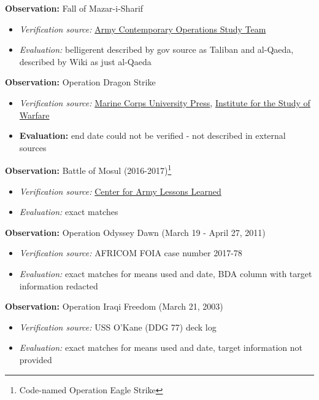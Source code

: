 \documentclass[fleqn,12pt]{article}
\begin{document}
\textbf{Observation:} Fall of Mazar-i-Sharif
\begin{itemize}
    \item \textit{Verification source:} \href{https://history.army.mil/html/bookshelves/resmat/GWOT/DifferentKindofWar.pdf}{Army Contemporary Operations Study Team}
    \item \textit{Evaluation:} belligerent described by gov source as Taliban and al-Qaeda, described by Wiki as just al-Qaeda
\end{itemize}

\textbf{Observation:} Operation Dragon Strike
\begin{itemize}
    \item \textit{Verification source:} \href{https://www.marines.mil/Portals/1/Publications/War,\%20Will,\%20and\%20Warlords.pdf}{Marine Corps University Press}, \href{https://www.understandingwar.org/sites/default/files/Afghanistan\%20Report\%207_15Dec.pdf}{Institute for the Study of Warfare}
    \item \textbf{Evaluation:} end date could not be verified - not described in external sources
\end{itemize}

\textbf{Observation:} Battle of Mosul (2016-2017)\footnote{Code-named Operation Eagle Strike}
\begin{itemize}
    \item \textit{Verification source:} \href{https://usacac.army.mil/sites/default/files/publications/CALL\%20Insider\%20MAR-APR17.pdf}{Center for Army Lessons Learned}
    \item \textit{Evaluation:} exact matches
\end{itemize}

\textbf{Observation:} Operation Odyssey Dawn (March 19 - April 27, 2011)
\begin{itemize}
    \item \textit{Verification source:} AFRICOM FOIA case number 2017-78
    \item \textit{Evaluation:} exact matches for means used and date, BDA column with target information redacted
\end{itemize}

\textbf{Observation:} Operation Iraqi Freedom (March 21, 2003)
\begin{itemize}
    \item \textit{Verification source:} USS O'Kane (DDG 77) deck log
    \item \textit{Evaluation:} exact matches for means used and date, target information not provided
\end{itemize}
\end{document}
